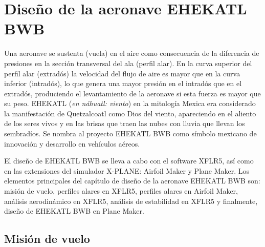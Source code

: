 


\chapter{Diseño de la aeronave EHEKATL BWB}

Una aeronave se sustenta (vuela) en el aire como consecuencia de la diferencia de presiones en la sección transversal del ala (perfil alar).  
En la curva superior del perfil alar (extradós) la velocidad del flujo de aire es mayor que en la curva inferior (intradós), lo que genera una mayor presión en el intradós que en el extradós, produciendo el levantamiento de la aeronave si esta fuerza es mayor que su peso.
%
EHEKATL (\textit{en náhuatl: viento}) en la mitología Mexica era considerado la manifestación de Quetzalcoatl como Dios del viento, apareciendo en el aliento de los seres vivos y en las brisas que traen las nubes con lluvia que llevan los sembradíos. 
Se nombra al proyecto EHEKATL BWB como símbolo mexicano de innovación y desarrollo en vehículos aéreos.

El diseño de EHEKATL BWB se lleva a cabo con el software XFLR5,
así como en las extensiones del simulador X-PLANE: Airfoil Maker y Plane Maker. 
Los elementos principales del capítulo de diseño de la aeronave EHEKATL BWB son: misión de vuelo, perfiles alares en XFLR5, perfiles alares en Airfoil Maker, análisis aerodinámico en XFLR5, análisis de estabilidad en XFLR5 y finalmente, diseño de EHEKATL BWB en Plane Maker.  

\section{Misión de vuelo}


